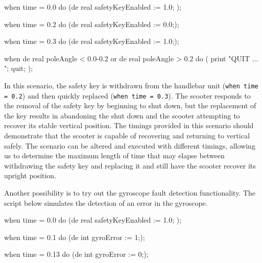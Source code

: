 \begin{dcl}[caption=DCL script which activates the scooter and then simulates the removal of the safety key and its replacement]
when time = 0.0 do (de real safetyKeyEnabled := 1.0; );

when time = 0.2 do (de real safetyKeyEnabled := 0.0;);

when time = 0.3 do (de real safetyKeyEnabled := 1.0;);

when de real poleAngle < 0.0-0.2
	or de real poleAngle > 0.2
	do ( print "QUIT ... "; quit; );

\end{dcl}

In this scenario, the safety key is withdrawn from the handlebar
unit (\texttt{when time = 0.2}) and then quickly replaced
(\texttt{when time = 0.3}). The scooter responds to the removal
of the safety key by beginning to shut down, but the replacement
of the key results in abandoning the shut down and the scooter
attempting to recover its stable vertical position. The timings
provided in this scenario should demonstrate that the scooter is
capable of recovering and returning to vertical safely. The
scenario can be altered and executed with different timings,
allowing us to determine the maximum length of time that may
elapse between withdrawing the safety key and replacing it and
still have the scooter recover its upright position.

Another possibility is to try out the gyroscope fault detection
functionality.  The script below simulates the detection of an error
in the gyroscope.

\begin{dcl}[caption=DCL script which activates the scooter and then simulates detection of a fault in the gyroscope]
when time = 0.0 do (de real safetyKeyEnabled := 1.0; );

when time = 0.1 do (de int gyroError := 1;);

when time = 0.13 do (de int gyroError := 0;);
\end{dcl}
